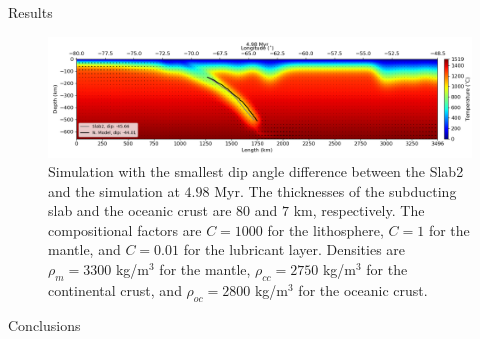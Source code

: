 \documentclass[final]{beamer}
\newlength{\colwidth}
\begin{document}
\begin{frame}[t]
\begin{columns}[t]
\begin{column}{\colwidth}
\begin{block}{Results}
  \begin{figure}
    \centering
    \includegraphics[width=0.22\paperwidth]{figures/angle-step_204.png}
    \caption{Simulation with the smallest dip angle difference between the Slab2 and the simulation at $4.98$ Myr. The thicknesses of the subducting slab and the oceanic crust are $80$ and $7$ km, respectively. The compositional factors are $C = 1000$ for the lithosphere, $C=1$ for the mantle, and $C=0.01$ for the lubricant layer. Densities are $\rho_m=3300$ kg/m$^3$ for the mantle, $\rho_{cc}=2750$ kg/m$^3$ for the continental crust, and $\rho_{oc}=2800$ kg/m$^3$ for the oceanic crust.}
    \label{fig:result4}
  \end{figure}

  \end{block}

  \begin{block}{Conclusions}


\end{block}
\end{column}
\end{columns}
\end{frame}
\end{document}
